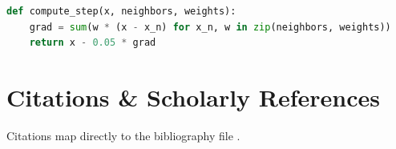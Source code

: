 \documentclass[10pt, journal]{IEEEtran}
\begin{document}
\begin{lstlisting}[language=Python, caption={Consensus gradient descent loop.}]
def compute_step(x, neighbors, weights):
    grad = sum(w * (x - x_n) for x_n, w in zip(neighbors, weights))
    return x - 0.05 * grad
\end{lstlisting}

\section{Citations \& Scholarly References}
Citations map directly to the bibliography file \cite{ieee_evans, ieee_ramirez}.



\end{document}

